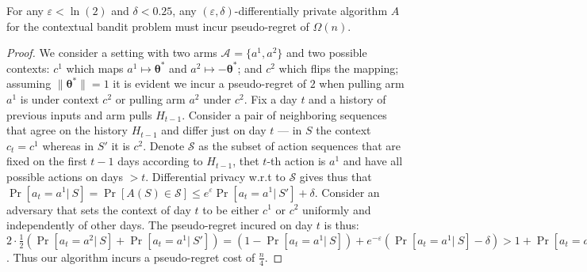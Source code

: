 \documentclass{article}
\renewcommand{\vec}[1]{\bm{#1}}
\newcommand{\Aset}[1]{\mathcal{A}_{#1}}
\begin{document}
\begin{claim}
\label{clm:standard_contextual_DP_implies_linear_regret}
For any $\varepsilon < \ln(2)$ and $\delta < 0.25$, any $(\varepsilon,\delta)$-differentially private algorithm $A$ for the contextual bandit problem must incur pseudo-regret of $\Omega(n)$.
\end{claim}
\begin{proof}
We consider a setting with two arms $\Aset{}=\{a^1,a^2\}$ and two possible contexts: $c^1$ which maps $a^1\mapsto \vec\theta^*$ and $a^2 \mapsto -\vec\theta^*$; and $c^2$ which flips the mapping; assuming $\|\vec\theta^*\|=1$ it is evident we incur a pseudo-regret of $2$ when pulling arm $a^1$ is under context $c^2$ or pulling arm $a^2$ under $c^2$. Fix a day $t$ and a history of previous inputs and arm pulls $H_{t-1}$. Consider a pair of neighboring sequences that agree on the history $H_{t-1}$ and differ just on day $t$ --- in $S$ the context $c_t =c^1$ whereas in $S'$ it is $c^2$. Denote $\mathcal{S}$ as the subset of action sequences that are fixed on the first $t-1$ days according to $H_{t-1}$, thet $t$-th action is $a^1$ and have all possible actions on days $>t$. Differential privacy w.r.t to $\mathcal{S}$ gives thus that $\Pr[a_t = a^1 |~S] = \Pr[A(S)\in \mathcal{S}] \leq e^\varepsilon \Pr[a_t=a^1 |~S'] + \delta$. Consider an adversary that sets the context of day $t$ to be either $c^1$ or $c^2$ uniformly and independently of other days. The pseudo-regret incured on day $t$ is thus: $2\cdot \tfrac 1 2 \left( \Pr[a_t=a^2|~S] + \Pr[a_t=a^1|~S'] \right)  = (1- \Pr[a_t=a^1|~S]) + e^{-\varepsilon}(\Pr[a_t=a^1|~S]-\delta) > 1 + \Pr[a_t=a^2|~S](e^{-\varepsilon}-1) - \delta > 1 - 1\cdot \tfrac 1 2 - \tfrac 1 4 = \tfrac 1 4$. Thus our algorithm incurs a pseudo-regret cost of $\tfrac n 4$.
\end{proof}
\end{document}
